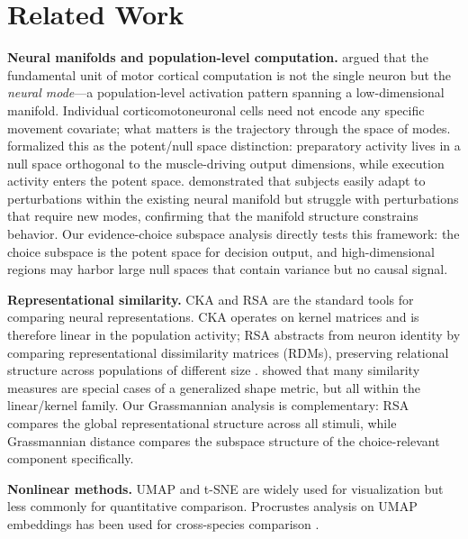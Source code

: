 \documentclass{article}
\begin{document}
\section{Related Work}

\textbf{Neural manifolds and population-level computation.} \citet{gallego2017neural} argued that the fundamental unit of motor cortical computation is not the single neuron but the \emph{neural mode}---a population-level activation pattern spanning a low-dimensional manifold. Individual corticomotoneuronal cells need not encode any specific movement covariate; what matters is the trajectory through the space of modes. \citet{kaufman2014cortical} formalized this as the potent/null space distinction: preparatory activity lives in a null space orthogonal to the muscle-driving output dimensions, while execution activity enters the potent space. \citet{sadtler2014neural} demonstrated that subjects easily adapt to perturbations within the existing neural manifold but struggle with perturbations that require new modes, confirming that the manifold structure constrains behavior. Our evidence-choice subspace analysis directly tests this framework: the choice subspace is the potent space for decision output, and high-dimensional regions may harbor large null spaces that contain variance but no causal signal.

\textbf{Representational similarity.} CKA \citep{kornblith2019similarity} and RSA \citep{kriegeskorte2008representational} are the standard tools for comparing neural representations. CKA operates on kernel matrices and is therefore linear in the population activity; RSA abstracts from neuron identity by comparing representational dissimilarity matrices (RDMs), preserving relational structure across populations of different size \citep{kriegeskorte2008representational}. \citet{williams2021generalized} showed that many similarity measures are special cases of a generalized shape metric, but all within the linear/kernel family. Our Grassmannian analysis is complementary: RSA compares the global representational structure across all stimuli, while Grassmannian distance compares the subspace structure of the choice-relevant component specifically.

\textbf{Nonlinear methods.} UMAP \citep{mcinnes2018umap} and t-SNE \citep{vandermaaten2008visualizing} are widely used for visualization but less commonly for quantitative comparison. Procrustes analysis on UMAP embeddings has been used for cross-species comparison \citep{deitch2021representational}.
\end{document}
